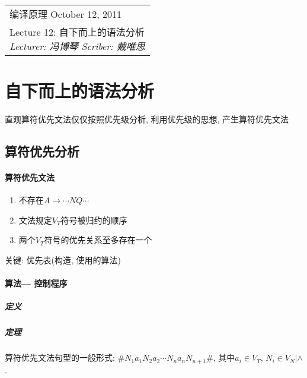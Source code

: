 \def\lecture{12}
\clearpage \noindent\begin{tabularx}{\linewidth}{|X|}
\hline \vskip -2mm
{\sf 编译原理} \hfill October 12, 2011 \\
{\centering \sf \large Lecture \lecture:
自下而上的语法分析 \\ }
\textsl{Lecturer: 冯博琴 \hfill Scriber: 戴唯思}\\ \hline
\end{tabularx}
\setcounter{section}{0}
\renewcommand{\thepage}{\lecture -\arabic{page}}

\newcommand\eqdot{=\hskip -.8em\cdot\ }

\section{自下而上的语法分析}

    直观算符优先文法仅仅按照优先级分析, 利用优先级的思想, 产生算符优先文法

    \subsection{算符优先分析}

        \paragraph{算符优先文法}

            \begin{enumerate}
                \item 不存在$A\to \cdots NQ\cdots$
                \item 文法规定$V_T$符号被归约的顺序
                \item 两个$V_T$符号的优先关系至多存在一个
            \end{enumerate}

            关键: \textsf{优先表}(构造, 使用的算法)

        \paragraph{算法--- 控制程序}

            \subparagraph{定义}


            \subparagraph{定理}

                算符优先文法句型的一般形式: $\#N_1a_1N_2a_2\cdots N_na_nN_{n+1}\#$, 其中$a_i\in V_T$, $N_i\in V_N|\wedge$.

